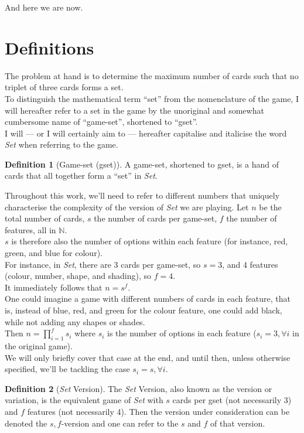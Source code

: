 \documentclass{article}
\theoremstyle{definition}
\newtheorem{defn}{Definition}
\theoremstyle{remark}
\begin{document}
And here we are now.

\section{Definitions}\label{sec:defs}

The problem at hand is to determine the maximum number of cards such that no triplet of three cards forms a set.\\
To distinguish the mathematical term ``set'' from the nomenclature of the game, I will hereafter refer to a set in the game by the unoriginal and somewhat cumbersome name of ``game-set'', shortened to ``gset''.\\
I will --- or I will certainly aim to --- hereafter capitalise and italicise the word \emph{Set} when referring to the game.
\begin{defn}[Game-set (gset)]
A game-set, shortened to gset, is a hand of cards that all together form a ``set'' in \emph{Set}.
\end{defn}
Throughout this work, we'll need to refer to different numbers that uniquely characterise the complexity of the version of \emph{Set} we are playing.
\medbreak
Let $n$ be the total number of cards, $s$ the number of cards per game-set, $f$ the number of features, all in $\mathbb{N}$.\\
$s$ is therefore also the number of options within each feature (for instance, red, green, and blue for colour).\\
For instance, in \emph{Set}, there are 3 cards per game-set, so $s=3$, and 4 features (colour, number, shape, and shading), so $f=4$.\\
It immediately follows that $n=s^f$.\\
One could imagine a game with different numbers of cards in each feature, that is, instead of blue, red, and green for the colour feature, one could add black, while not adding any shapes or shades.\\
Then $n=\prod_{i=1}^{f}{s_i}$ where $s_i$ is the number of options in each feature ($s_i=3,\forall i$ in the original game).\\
We will only briefly cover that case at the end, and until then, unless otherwise specified, we'll be tackling the case $s_i=s,\forall i$. 
\begin{defn}[\emph{Set} Version]
The \emph{Set} Version, also known as the version or variation, is the equivalent game of \emph{Set} with $s$ cards per gset (not necessarily 3) and $f$ features (not necessarily 4). Then the version under consideration can be denoted the $s,f$-version and one can refer to the $s$ and $f$ of that version.
\end{defn}
\end{document}
